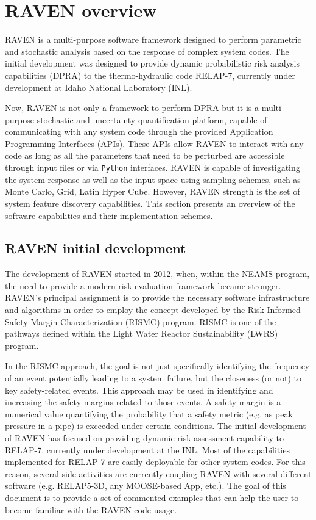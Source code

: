 \section{RAVEN overview}
RAVEN is a multi-purpose software framework designed to perform parametric and stochastic analysis based on the response of complex system codes. The initial development was designed to provide dynamic probabilistic risk analysis capabilities (DPRA) to the thermo-hydraulic code RELAP-7, currently under development
at Idaho National Laboratory (INL). 

Now, RAVEN is not only a framework to perform DPRA but it is a multi-purpose stochastic and uncertainty quantification platform, capable of communicating with any system code through the provided  Application Programming Interfaces (APIs). These APIs allow RAVEN to interact with any code as long as all the parameters that need to be perturbed are accessible through input files or via  \texttt{Python} interfaces. RAVEN is capable of investigating the system response as well as the input space using sampling schemes, such as Monte Carlo, Grid, Latin Hyper Cube. However, RAVEN strength is the set of system feature discovery capabilities. This section presents an overview of the software capabilities and their implementation schemes. 

\subsection{RAVEN initial development}
The development of RAVEN started in 2012, when, within the NEAMS program, the need to provide a modern risk evaluation framework became stronger. RAVEN’s principal assignment is to provide the necessary software infrastructure and algorithms in order to employ the concept developed by the Risk Informed Safety Margin Characterization (RISMC) program. RISMC is one of the pathways defined within the Light Water Reactor Sustainability (LWRS) program. 

In the RISMC approach, the goal is not just specifically identifying the frequency of an event potentially leading to a system failure, but the closeness (or not) to key safety-related events. This approach may be used in identifying and increasing the safety margins related to those events. A safety margin is a numerical value quantifying the probability that a safety metric (e.g. as peak pressure in a pipe) is exceeded under certain conditions.
The initial development of RAVEN has focused on providing dynamic risk assessment capability to RELAP-7, currently under development at the INL.
Most of the capabilities implemented for RELAP-7 are easily deployable for other system codes. For this reason, several side activities  are currently coupling RAVEN with several different software (e.g.  RELAP5-3D, any MOOSE-based App, etc.).
The goal of this document is to provide a set of commented examples that can help the user to become familiar 
with the RAVEN code usage.


